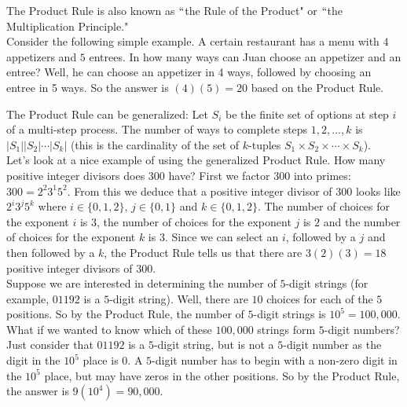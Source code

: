 \documentclass[12pt]{amsart}
\theoremstyle{definition}
\theoremstyle{remark}
\begin{document}
The Product Rule is also known as $``$the Rule of the Product" or $``$the Multiplication Principle."\\

Consider the following simple example.  A certain restaurant has a menu with $4$ appetizers and $5$ entrees.  In how many ways can Juan choose an appetizer and an entree?  Well, he can choose an appetizer in 4 ways, followed by choosing an entree in 5 ways.  So the answer is $(4)(5)=20$ based on the Product Rule.

\newpage

The Product Rule can be generalized:  Let $S_i$ be the finite set of options at step $i$ of a multi-step process.  The number of ways to complete steps $1,2,...,k$ is $|S_1||S_2|\cdots |S_k|$ (this is the cardinality of the set of $k$-tuples $S_1\times S_2\times\cdots \times S_k$).\\


Let's look at a nice example of using the generalized Product Rule.  How many positive integer divisors does $300$ have?  First we factor $300$ into primes:  $300=2^2 3^1 5^2$.  From this we deduce that a positive integer divisor of $300$ looks like $2^i 3^j 5^k$ where $i\in\{0,1,2\}$, $j\in\{0,1\}$ and $k\in\{0,1,2\}$.  The number of choices for the exponent $i$ is $3$, the number of choices for the exponent $j$ is $2$ and the number of choices for the exponent $k$ is $3$.  Since we can select an $i$, followed by a $j$ and then followed by a $k$, the Product Rule tells us that there are $3(2)(3)=18$ positive integer divisors of $300$.\\

Suppose we are interested in determining the number of $5$-digit strings (for example, $01192$ is a $5$-digit string).  Well, there are $10$ choices for each of the $5$ positions.  So by the Product Rule, the number of $5$-digit strings is $10^5=100,000$. \\

What if we wanted to know which of these $100,000$ strings form $5$-digit numbers?  Just consider that $01192$ is a $5$-digit string, but is not a $5$-digit number as the digit in the $10^5$ place is $0$.  A $5$-digit number has to begin with a non-zero digit in the $10^5$ place, but may have zeros in the other positions.  So by the Product Rule, the answer is $9(10^4)=90,000$.\\
\end{document}
